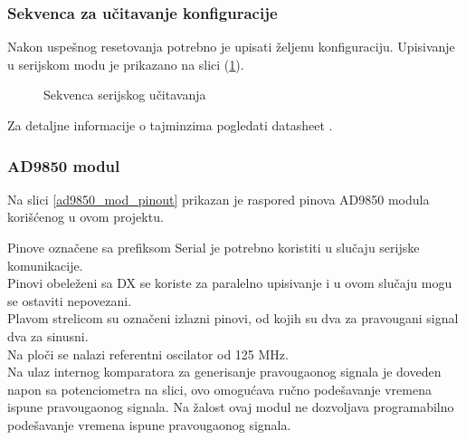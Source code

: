 \subsubsection{Sekvenca za učitavanje konfiguracije}

Nakon uspešnog resetovanja potrebno je upisati željenu konfiguraciju.
Upisivanje u serijskom modu je prikazano na slici (\ref{ad9850_load_seq}).

\begin{figure}[H]
  \centering{
    \scalebox{1.1}{
      
    }}
  \caption{Sekvenca serijskog učitavanja}
  \label{ad9850_load_seq}
\end{figure}

Za detaljne informacije o tajminzima pogledati datasheet \cite{AD9850_ds}.

\newpage

\subsubsection{AD9850 modul}

Na slici \ref{ad9850_mod_pinout} prikazan je raspored pinova AD9850 modula
korišćenog u ovom projektu. \\

\begin{figure}[H]
\end{figure}


Pinove označene sa prefiksom Serial je potrebno koristiti u slučaju serijske
komunikacije. \\
Pinovi obeleženi sa DX se koriste za paralelno upisivanje i u ovom slučaju mogu
se ostaviti nepovezani. \\
Plavom strelicom su označeni izlazni pinovi, od kojih su dva za pravougani
signal dva za sinusni. \\

Na ploči se nalazi referentni oscilator od 125 MHz. \\

Na ulaz internog komparatora za generisanje pravougaonog signala je doveden
napon sa potenciometra na slici, ovo omogućava ručno podešavanje vremena ispune
pravougaonog signala.
Na žalost ovaj modul ne dozvoljava programabilno podešavanje vremena ispune
pravougaonog signala. \\